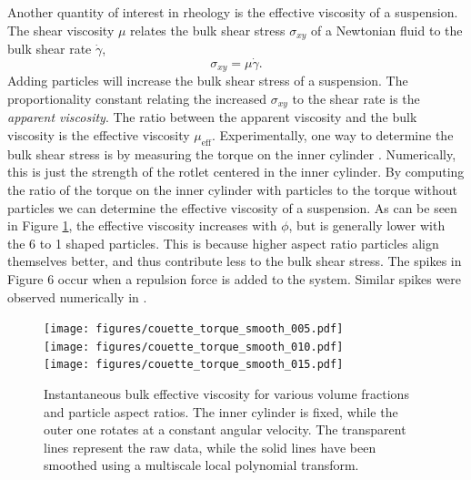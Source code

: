 \documentclass[preprint, 10pt]{elsarticle}
\begin{document}
Another quantity of interest in rheology is the effective viscosity of a suspension. The shear viscosity $\mu$ relates the bulk shear stress $\sigma_{xy}$ of a Newtonian fluid to the bulk shear rate $\dot{\gamma}$,
\[ \sigma_{xy} = \mu\dot{\gamma}.\]
 Adding particles will increase the bulk shear stress of a suspension. The proportionality constant relating the increased $\sigma_{xy}$ to the shear rate is the \textit{apparent viscosity}. The ratio between the apparent viscosity and the bulk viscosity is the effective viscosity $\mu_{\text{eff}}$. Experimentally, one way to determine the bulk shear stress is by measuring the torque on the inner cylinder \cite{Koos2012}. Numerically, this is just the strength of the rotlet centered in the inner cylinder. By computing the ratio of the torque on the inner cylinder with particles to the torque without particles we can determine the effective viscosity of a suspension.  As can be seen in Figure
\ref{fig:torque}, the effective viscosity increases with $\phi$, but is
generally lower with the 6 to 1 shaped particles. This is because higher aspect ratio particles align themselves better, and thus contribute less to the bulk shear stress. The spikes in Figure 6 occur
when a repulsion force is added to the system. Similar spikes were observed numerically in
\cite{Lu2017}.
\begin{figure}[!h]
\begin{center}
\texttt{[image: figures/couette\_torque\_smooth\_005.pdf]}\\
\texttt{[image: figures/couette\_torque\_smooth\_010.pdf]}\\
\texttt{[image: figures/couette\_torque\_smooth\_015.pdf]}
\end{center}
\caption{Instantaneous bulk effective viscosity for various volume fractions and particle aspect ratios. The inner
cylinder is fixed, while the outer one rotates at a constant angular velocity. The transparent lines represent the raw data, while the solid lines have been smoothed using a multiscale local polynomial transform. }\label{fig:torque}
\end{figure} 
\end{document}
